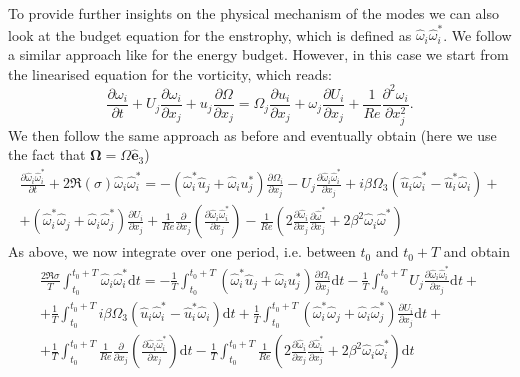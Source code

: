 To provide further insights on the physical mechanism of the modes we can also look at the budget equation for the enstrophy, which is defined as $\hat{\omega}_i \hat{\omega}_i^*$. We follow a similar approach like for the energy budget. However, in this case we start from the linearised equation for the vorticity, which reads:
%
\begin{equation}
  \frac{\partial \omega_i}{\partial t} + U_j \frac{\partial \omega_i}{\partial x_j} + u_j \frac{\partial \Omega}{\partial x_j} = \Omega_j \frac{\partial u_i}{\partial x_j} + \omega_j \frac{\partial U_i}{\partial x_j} + \frac{1}{Re} \frac{\partial^2 \omega_i}{\partial x_j^2}.
\end{equation}
%
We then follow the same approach as before and eventually obtain (here we use the fact that $\bm{\Omega} = \Omega \hat{\bm{e}}_3$)
%
\begin{equation}
  \begin{gathered}
  \frac{\partial \hat{\omega}_i \hat{\omega}^*_i}{\partial t} + 
  2 \Re(\sigma) \hat{\omega}_i \hat{\omega}_i^* = 
  - \left( \hat{\omega}_i^* \hat{u}_j + \hat{\omega}_i u_j^* \right) \frac{\partial \Omega_i}{\partial x_j} 
  - U_j \frac{\partial \hat{\omega}_i \hat{\omega}_i^* }{\partial x_j}  +
   i \beta \Omega_3 \left( \hat{u}_i \hat{\omega}_{i}^* - \hat{u}_i^* \hat{\omega}_i \right)  + \\
   + \left( \hat{\omega}_i^* \hat{\omega}_j + \hat{\omega}_i \hat{\omega}_j^* \right) \frac{\partial U_i}{\partial x_j} + 
   \frac{1}{Re} \frac{\partial}{\partial x_j} \left( \frac{\partial \hat{\omega}_i \hat{\omega}_i^*}{\partial x_j} \right) -
   \frac{1}{Re} \left( 2 \frac{\partial \hat{\omega}_i}{\partial x_j} \frac{\partial \hat{\omega}^*}{\partial x_j} + 2 \beta^2 \hat{\omega}_i \hat{\omega}^* \right)
  \end{gathered}
\end{equation}
%
As above, we now integrate over one period, i.e. between $t_0$ and $t_0+T$ and obtain
%
\begin{equation}
  \begin{gathered}
  \frac{2 \Re{\sigma}}{T} \int_{t_0}^{t_0+T} \hat{\omega}_i \hat{\omega}_i^* \text{d}t = 
  - \frac{1}{T} \int_{t_0}^{t_0+T} \left( \hat{\omega}_i^* \hat{u}_j + \hat{\omega}_i u_j^* \right) \frac{\partial \Omega_i}{\partial x_j} \text{d}t
  - \frac{1}{T} \int_{t_0}^{t_0+T} U_j \frac{\partial \hat{\omega}_i \hat{\omega}_i^* }{\partial x_j} \text{d} t + \\
  + \frac{1}{T} \int_{t_0}^{t_0+T}    i \beta \Omega_3 \left( \hat{u}_i \hat{\omega}_{i}^* - \hat{u}_i^* \hat{\omega}_i \right)  \text{d} t
  + \frac{1}{T} \int_{t_0}^{t_0+T} \left( \hat{\omega}_i^* \hat{\omega}_j + \hat{\omega}_i \hat{\omega}_j^* \right) \frac{\partial U_i}{\partial x_j} \text{d} t + \\
  + \frac{1}{T} \int_{t_0}^{t_0+T}    \frac{1}{Re} \frac{\partial}{\partial x_j} \left( \frac{\partial \hat{\omega}_i \hat{\omega}_i^*}{\partial x_j} \right) \text{d} t -
  \frac{1}{T} \int_{t_0}^{t_0+T} \frac{1}{Re} \left( 2 \frac{\partial \hat{\omega}_i}{\partial x_j} \frac{\partial \hat{\omega}_i^*}{\partial x_j} + 2 \beta^2 \hat{\omega}_i \hat{\omega}_i^* \right) \text{d} t
  \end{gathered}
\end{equation}
